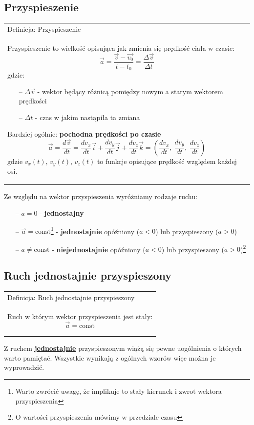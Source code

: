 \documentclass[a4paper]{article}
\newenvironment{definition}[1][title]
    {
        \begin{center}
        \begin{tabular}{|p{1\textwidth}|}
        \hline
            Definicja: #1\\[2ex]
        \begin{em}
        \Large
    }
    { 
        \end{em}
        \\\hline
        \end{tabular} 
        \end{center}
    }
\begin{document}
    \subsection{\LARGE Przyspieszenie}
        \Large
        \begin{definition}[Przyspieszenie]
            Przyspieszenie to wielkość opisująca jak zmienia się prędkość ciała w czasie:
            \[\vec{a} = \frac{\vec{v} - \vec{v_0}}{t - t_0} = \frac{\Delta\vec{v}}{\Delta t}\]
            gdzie:
            \begin{itemize}
                \item[--] $\Delta\vec{v}$ - wektor będący różnicą pomiędzy nowym a starym wektorem prędkości
                \item[--] $\Delta t$ - czas w jakim nastąpiła ta zmiana 
            \end{itemize}
            Bardziej ogólnie: \textbf{pochodna prędkości po czasie}
            \[\vec{a} = \frac{d\vec{v}}{dt} = \frac{dv_x}{dt}\vec{i} + \frac{dv_y}{dt}\vec{j} + \frac{dv_z}{dt}\vec{k} 
            = \left (\frac{dv_x}{dt},\ \frac{dv_y}{dt},\ \frac{dv_z}{dt} \right )\]
            gdzie $v_x(t)$, $v_y(t)$, $v_z(t)$ to funkcje opisujące prędkość względem każdej osi.
        \end{definition}
        Ze względu na wektor przyspieszenia wyróżniamy rodzaje ruchu:
        \begin{itemize}
            \item[--] $a = 0$ - \textbf{jednostajny}
            \item[--] $\vec{a} = \text{const}$\footnote{\large Warto zwrócić uwagę, że implikuje to stały kierunek i zwrot wektora przyspieszenia} 
            - \textbf{jednostajnie} opóźniony ($a < 0$) lub przyspieszony ($a > 0$)
            \item[--] $a \neq \text{const}$ - \textbf{niejednostajnie} opóźniony ($a < 0$) lub przyspieszony ($a > 0$)\footnote{\large O wartości przyspieszenia mówimy w przedziale czasu}
        \end{itemize}
    \pagebreak
    \subsection{\LARGE Ruch jednostajnie przyspieszony}
        \Large
        \begin{definition}[Ruch jednostajnie przyspieszony]
            Ruch w którym wektor przyspieszenia jest stały:
            \[\vec{a} = \text{const}\] 
        \end{definition}
        Z ruchem \underline{\textbf{jednostajnie}} przyspieszonym wiążą się pewne uogólnienia o których warto pamiętać.
        Wszystkie wynikają z ogólnych wzorów więc można je wyprowadzić.\\
\end{document}
